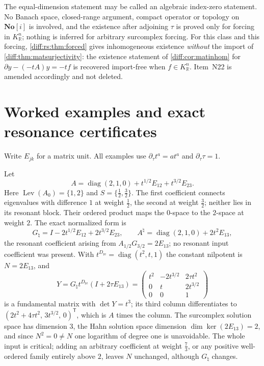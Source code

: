 \documentclass[11pt,letterpaper]{article}
\numberwithin{equation}{section}
\theoremstyle{definition}
\theoremstyle{remark}
\newcommand{\SC}{\mathbf{No}[i]}
\newcommand{\R}{\mathbb R}
\newcommand{\der}{\partial}
\newcommand{\Ker}{\operatorname{ker}}
\newcommand{\derT}{\der_{\tau}}
\newcommand{\KR}{K_{\R}}
\newcommand{\Lev}{\operatorname{Lev}}
\begin{document}
\begin{remark}
\label{diff:rs:rem:fredholm}
The equal-dimension statement may be called an algebraic index-zero statement.
No Banach space, closed-range argument, compact operator or topology on $\SC$ is
involved, and the existence after adjoining $\tau$ is proved only for forcing
in $\KR^{n}$; nothing is inferred for arbitrary surcomplex forcing. For this
class and this forcing, \cref{diff:rs:thm:forced} gives inhomogeneous existence
\emph{without} the import of \cref{diff:thm:matsurjectivity}: the existence
statement of \cref{diff:cor:matinhom} for $\der y-(-tA)y=-tf$ is recovered
import-free when $f\in\KR^{n}$. Item~N22 is amended accordingly and not deleted.
\end{remark}

\section{Worked examples and exact resonance certificates}
\label{diff:rs:sec:examples}

Write $E_{jk}$ for a matrix unit. All examples use $\derT t^{a}=at^{a}$ and
$\derT\tau=1$.

\begin{example}
\label{diff:rs:ex:interaction}
Let
\[
 A=\operatorname{diag}(2,1,0)+t^{1/2}E_{12}+t^{3/2}E_{23}.
\]
Here $\Lev(A_{0})=\{1,2\}$ and $S=\{\tfrac12,\tfrac32\}$. The first coefficient
connects eigenvalues with difference $1$ at weight $\tfrac12$, the second at
weight $\tfrac32$; neither lies in its resonant block. Their ordered product maps
the $0$-space to the $2$-space at weight $2$. The exact normalized form is
\[
 G_{\natural}=I-2t^{1/2}E_{12}+2t^{3/2}E_{23},
 \qquad
 A^{\natural}=\operatorname{diag}(2,1,0)+2t^{2}E_{13},
\]
the resonant coefficient arising from $A_{1/2}G_{3/2}=2E_{13}$; no resonant
input coefficient was present. With $t^{D_{\mathrm{re}}}=\operatorname{diag}(t^{2},t,1)$
the constant nilpotent is $N=2E_{13}$, and
\[
 Y=G_{\natural}t^{D_{\mathrm{re}}}(I+2\tau E_{13})
 =\begin{pmatrix}t^{2}&-2t^{3/2}&2\tau t^{2}\\0&t&2t^{3/2}\\0&0&1\end{pmatrix}
\]
is a fundamental matrix with $\det Y=t^{3}$; its third column differentiates to
$(2t^{2}+4\tau t^{2},\,3t^{3/2},\,0)^{\mathsf T}$, which is $A$ times the column.
The surcomplex solution space has dimension $3$, the Hahn solution space
dimension $\dim\Ker(2E_{13})=2$, and since $N^{2}=0\neq N$ one logarithm of
degree one is unavoidable. The whole input is critical; adding an arbitrary
coefficient at weight $\tfrac73$, or any positive well-ordered family entirely
above $2$, leaves $N$ unchanged, although $G_{\natural}$ changes.
\end{example}
\end{document}
